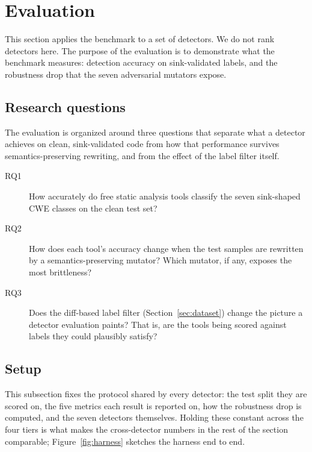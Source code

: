 \section{Evaluation}
\label{sec:evaluation}

This section applies the benchmark to a set of detectors. We do not
rank detectors here. The purpose of the evaluation is to demonstrate
what the benchmark measures: detection accuracy on sink-validated
labels, and the robustness drop that the seven adversarial mutators
expose.

\subsection{Research questions}
\label{sec:eval:rq}

The evaluation is organized around three questions that separate what
a detector achieves on clean, sink-validated code from how that
performance survives semantics-preserving rewriting, and from the
effect of the label filter itself.

\begin{description}
  \item[RQ1] How accurately do free static analysis tools classify the
    seven sink-shaped CWE classes on the clean test set?
  \item[RQ2] How does each tool's accuracy change when the test
    samples are rewritten by a semantics-preserving mutator? Which
    mutator, if any, exposes the most brittleness?
  \item[RQ3] Does the diff-based label filter (Section~\ref{sec:dataset})
    change the picture a detector evaluation paints? That is, are the
    tools being scored against labels they could plausibly satisfy?
\end{description}

\subsection{Setup}
\label{sec:eval:setup}

This subsection fixes the protocol shared by every detector: the test
split they are scored on, the five metrics each result is reported on,
how the robustness drop is computed, and the seven detectors
themselves. Holding these constant across the four tiers is what makes
the cross-detector numbers in the rest of the section comparable;
Figure~\ref{fig:harness} sketches the harness end to end.


